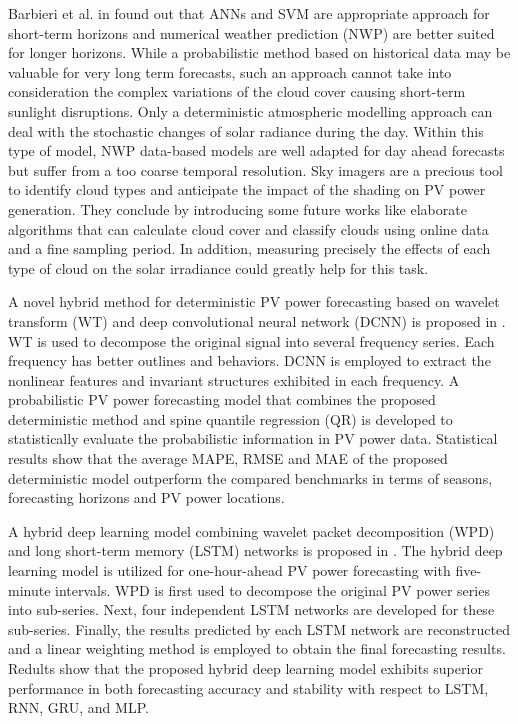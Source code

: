 Barbieri et al. in \cite{BARBIERI2017242} found out that ANNs and SVM are appropriate approach for short-term horizons and numerical weather prediction (NWP) are better suited for longer horizons.
While a probabilistic method based on historical data may be valuable for very long term forecasts, such an approach cannot take into consideration the complex variations of the cloud cover causing short-term sunlight disruptions.
Only a deterministic atmospheric modelling approach can deal with the stochastic changes of solar radiance during the day.
Within this type of model, NWP data-based models are well adapted for day ahead forecasts but suffer from a too coarse temporal resolution.
Sky imagers are a precious tool to identify cloud types and anticipate the impact of the shading on PV power generation.
They conclude by introducing some future works like elaborate algorithms that can calculate cloud cover and classify clouds using online data and a fine sampling period.
In addition, measuring precisely the effects of each type of cloud on the solar irradiance could greatly help for this task.

A novel hybrid method for deterministic PV power forecasting based on wavelet transform (WT) and deep convolutional neural network (DCNN) is proposed in \cite{WANG2017409}.
WT is used to decompose the original signal into several frequency series.
Each frequency has better outlines and behaviors.
DCNN is employed to extract the nonlinear features and invariant structures exhibited in each frequency. 
A probabilistic PV power forecasting model that combines the proposed deterministic method and spine quantile regression (QR) is developed to statistically evaluate the probabilistic information in PV power data.
Statistical results show that the average MAPE, RMSE and MAE of the proposed deterministic model outperform the compared benchmarks in terms of seasons, forecasting horizons and PV power locations.

A hybrid deep learning model combining wavelet packet decomposition (WPD) and long short-term memory (LSTM) networks is proposed in \cite{LI2020114216}.
The hybrid deep learning model is utilized for one-hour-ahead PV power forecasting with five-minute intervals.
WPD is first used to decompose the original PV power series into sub-series.
Next, four independent LSTM networks are developed for these sub-series.
Finally, the results predicted by each LSTM network are reconstructed and a linear weighting method is employed to obtain the final forecasting results.
Redults show that the proposed hybrid deep learning model exhibits superior performance in both forecasting accuracy and stability with respect to LSTM, RNN, GRU, and MLP.


